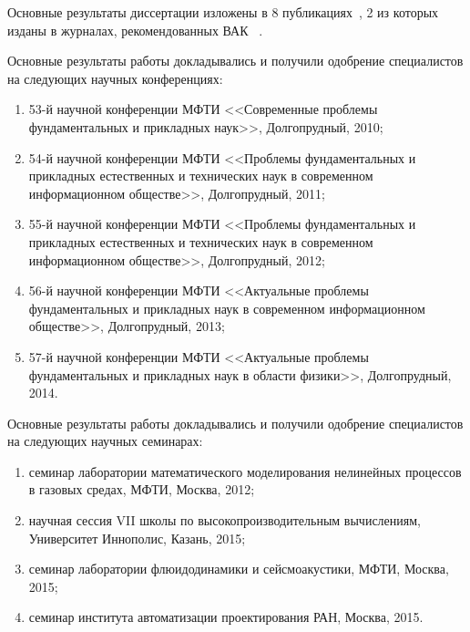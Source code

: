 Основные результаты диссертации изложены в 8 публикациях~\cite{skalko2014, tsybulin2015a, tsybulin2015b, miptconf53,miptconf54,miptconf55,miptconf56,miptconf57},
2 из которых изданы в журналах, рекомендованных ВАК~\cite{skalko2014,tsybulin2015a}%
.

Основные результаты работы докладывались и получили одобрение специалистов на следующих научных конференциях:
\begin{enumerate}
\item 53-й научной конференции МФТИ <<Современные проблемы фундаментальных и прикладных наук>>, Долгопрудный, 2010;
\item 54-й научной конференции МФТИ <<Проблемы фундаментальных и прикладных естественных и технических наук в современном информационном обществе>>, Долгопрудный, 2011;
\item 55-й научной конференции МФТИ <<Проблемы фундаментальных и прикладных естественных и технических наук в современном информационном обществе>>, Долгопрудный, 2012;
\item 56-й научной конференции МФТИ <<Актуальные проблемы фундаментальных и прикладных наук в современном информационном обществе>>, Долгопрудный, 2013;
\item 57-й научной конференции МФТИ <<Актуальные проблемы фундаментальных и прикладных наук в области физики>>, Долгопрудный, 2014.
\end{enumerate}

Основные результаты работы докладывались и получили одобрение специалистов на следующих научных семинарах:
\begin{enumerate}
\item семинар лаборатории математического моделирования нелинейных процессов в газовых средах, МФТИ, Москва, 2012;
\item научная сессия VII школы по высокопроизводительным вычислениям, Университет Иннополис, Казань, 2015;
\item семинар лаборатории флюидодинамики и сейсмоакустики, МФТИ, Москва, 2015;
\item семинар института автоматизации проектирования РАН, Москва, 2015.
\end{enumerate}
